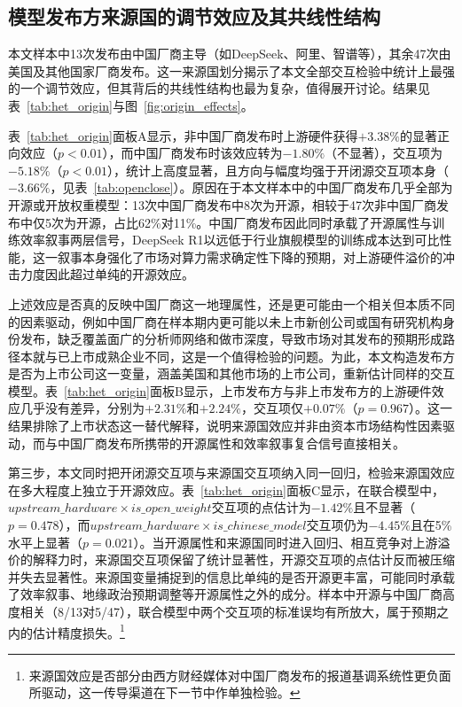 \documentclass[11pt,fontset=fandol,a4paper]{ctexart}
\newcommand{\changed}[1]{{\color{orange!85!black}#1}}
\begin{document}
\subsection{模型发布方来源国的调节效应及其共线性结构}\label{sec:origin_het}

本文样本中13次发布由中国厂商主导（如DeepSeek、阿里、智谱等），其余47次由美国及其他国家厂商发布。这一来源国划分揭示了本文全部交互检验中统计上最强的一个调节效应，但其背后的共线性结构也最为复杂，值得展开讨论。结果见表~\ref{tab:het_origin}与图~\ref{fig:origin_effects}。

表~\ref{tab:het_origin}面板A显示，非中国厂商发布时上游硬件获得$+3.38\%$的显著正向效应（$p<0.01$），而中国厂商发布时该效应转为$-1.80\%$（不显著），交互项为$-5.18\%$（$p<0.01$），统计上高度显著，且方向与幅度均强于开闭源交互项本身（$-3.66\%$，见表~\ref{tab:openclose}）。原因在于本文样本中的中国厂商发布几乎全部为开源或开放权重模型：13次中国厂商发布中8次为开源，相较于47次非中国厂商发布中仅5次为开源，占比62\%对11\%。中国厂商发布因此同时承载了开源属性与训练效率叙事两层信号，DeepSeek R1以远低于行业旗舰模型的训练成本达到可比性能，这一叙事本身强化了市场对算力需求确定性下降的预期，对上游硬件溢价的冲击力度因此超过单纯的开源效应。

\changed{上述效应是否真的反映中国厂商这一地理属性，还是更可能由一个相关但本质不同的因素驱动，例如中国厂商在样本期内更可能以未上市新创公司或国有研究机构身份发布，缺乏覆盖面广的分析师网络和做市深度，导致市场对其发布的预期形成路径本就与已上市成熟企业不同，这是一个值得检验的问题。为此，本文构造发布方是否为上市公司这一变量，涵盖美国和其他市场的上市公司，重新估计同样的交互模型。表~\ref{tab:het_origin}面板B显示，上市发布方与非上市发布方的上游硬件效应几乎没有差异，分别为$+2.31\%$和$+2.24\%$，交互项仅$+0.07\%$（$p=0.967$）。这一结果排除了上市状态这一替代解释，说明来源国效应并非由资本市场结构性因素驱动，而与中国厂商发布所携带的开源属性和效率叙事复合信号直接相关。}

第三步，本文同时把开闭源交互项与来源国交互项纳入同一回归，检验来源国效应在多大程度上独立于开源效应。表~\ref{tab:het_origin}面板C显示，在联合模型中，$upstream\_hardware \times is\_open\_weight$交互项的点估计为$-1.42\%$且不显著（$p=0.478$），而$upstream\_hardware \times is\_chinese\_model$交互项仍为$-4.45\%$且在5\%水平上显著（$p=0.021$）。当开源属性和来源国同时进入回归、相互竞争对上游溢价的解释力时，来源国交互项保留了统计显著性，开源交互项的点估计反而被压缩并失去显著性。来源国变量捕捉到的信息比单纯的是否开源更丰富，可能同时承载了效率叙事、地缘政治预期调整等开源属性之外的成分。样本中开源与中国厂商高度相关（8/13对5/47），联合模型中两个交互项的标准误均有所放大，属于预期之内的估计精度损失。\footnote{来源国效应是否部分由西方财经媒体对中国厂商发布的报道基调系统性更负面所驱动，这一传导渠道在下一节中作单独检验。}
\end{document}
